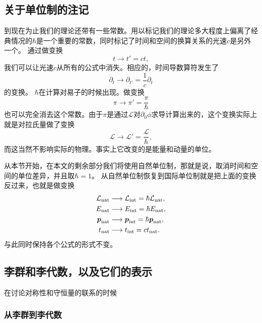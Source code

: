 \documentclass[hyperref, UTF8, a4paper]{ctexart}
\begin{document}
\subsection{关于单位制的注记}

到现在为止我们的理论还带有一些常数。用以标记我们的理论多大程度上偏离了经典情况的$\hbar$是一个重要的常数，同时标记了时间和空间的换算关系的光速$c$是另外一个。
通过做变换
\[
    t \longrightarrow t' = ct,
\]
我们可以让光速$c$从所有的公式中消失。相应的，时间导数算符发生了
\[
    \partial_t \longrightarrow \partial_{t'} = \frac{1}{c} \partial_t
\]
的变换。
$\hbar$在计算对易子的时候出现。做变换
\[
    \pi \longrightarrow \pi' = \frac{\pi}{\hbar}
\]
也可以完全消去这个常数。由于$\pi$是通过$\mathcal{L}$对$\partial_0 \phi$求导计算出来的，这个变换实际上就是对拉氏量做了变换
\[
    \mathcal{L} \longrightarrow \mathcal{L}' = \frac{\mathcal{L}}{\hbar},
\]
而这当然不影响实际的物理。事实上它改变的是能量和动量的单位。

从本节开始，在本文的剩余部分我们将使用自然单位制，那就是说，取消时间和空间的单位差异，并且取$\hbar = 1$。
从自然单位制恢复到国际单位制就是把上面的变换反过来，也就是做变换
\[
    \begin{aligned}
        \mathcal{L}_\text{nat} &\longrightarrow \mathcal{L}_\text{int} = \hbar \mathcal{L}_\text{nat}, \\
        E_\text{nat} &\longrightarrow E_\text{int} = \hbar E_\text{nat} , \\
        \vb*{p}_\text{nat} &\longrightarrow \vb*{p}_\text{int} = \hbar \vb*{p}_\text{nat}, \\
        t_\text{nat} &\longrightarrow t_\text{int} = c t_\text{nat}.
    \end{aligned}
\]
与此同时保持各个公式的形式不变。

\subsection{李群和李代数，以及它们的表示}
在讨论对称性和守恒量的联系的时候

\subsubsection{从李群到李代数}
\end{document}

